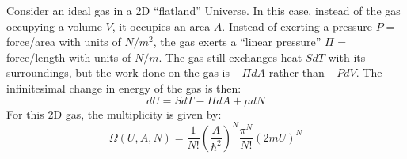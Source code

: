 \question Consider an ideal gas in a 2D ``flatland'' Universe. In this case, instead of the gas occupying a volume $V$, it occupies an area $A$. Instead of exerting a pressure $P=$ force/area with units of $N/m^2$, the gas exerts a ``linear pressure'' $\Pi$ = force/length with units of $N/m$. The gas still exchanges heat $SdT$ with its surroundings, but the work done on the gas is $-\Pi dA$ rather than $-PdV$. The infinitesimal change in energy of the gas is then:
\begin{equation*}
	dU=SdT-\Pi dA +\mu dN
\end{equation*}
For this 2D gas, the multiplicity is given by:
\begin{equation*}
	\Omega(U,A,N)=\frac{1}{N!}\left(\frac{A}{\hbar^2}\right)^N\frac{\pi^N}{N!}\left(2mU\right)^N
\end{equation*}
